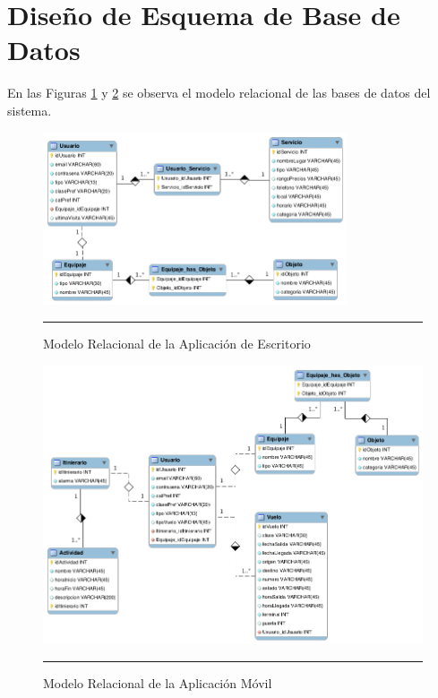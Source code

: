 \newpage
\section{Diseño de Esquema de Base de Datos}

En las Figuras \ref{fig:relacionalAdmin} y \ref{fig:relacionalMovil} se observa el modelo relacional de las bases de datos del sistema.

\begin{figure}[h!]
	\centering
		\includegraphics[width=0.8\textwidth]{Figuras/relacionalAdmin.png}
		\rule{30em}{0.5pt}
	\caption[Modelo Relacional de la Aplicación de Escritorio]{Modelo Relacional de la Aplicación de Escritorio}
	\label{fig:relacionalAdmin}
\end{figure}

\begin{figure}[h!]
	\centering
		\includegraphics[width=1\textwidth]{Figuras/relacionalMovil.png}
		\rule{30em}{0.5pt}
	\caption[Modelo Relacional de la Aplicación Móvil]{Modelo Relacional de la Aplicación Móvil}
	\label{fig:relacionalMovil}
\end{figure}